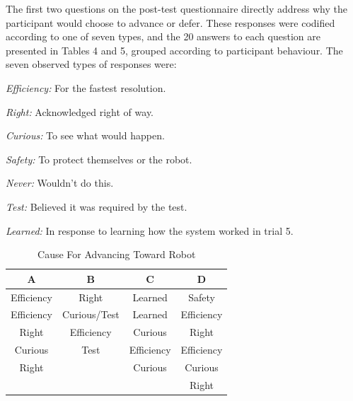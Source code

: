 \documentclass[letterpaper, 10 pt, conference]{ieeeconf}  %
\begin{document}

The first two questions on the post-test questionnaire directly address why the participant would choose to advance or defer. These responses were codified according to one of seven types, and the 20 answers to each question are presented in Tables 4 and 5, grouped according to participant behaviour. The seven observed types of responses were:

\textit{Efficiency:} For the fastest resolution.

\textit{Right:} Acknowledged right of way.

\textit{Curious:} To see what would happen.

\textit{Safety:} To protect themselves or the robot.

\textit{Never:} Wouldn't do this.

\textit{Test:} Believed it was required by the test.

\textit{Learned:} In response to learning how the system worked in trial 5.

\begin{table}[h]
\caption{Cause For Advancing Toward Robot}
\label{Advance}
\begin{center}
\begin{tabular}{|c||c||c||c|}
\hline
\textbf{A} & \textbf{B} & \textbf{C} & \textbf{D}\\
\hline
Efficiency & Right & Learned & Safety\\
\hline
Efficiency & Curious/Test & Learned & Efficiency\\
\hline
Right & Efficiency & Curious & Right\\
\hline
Curious & Test & Efficiency & Efficiency\\
\hline
Right & & Curious & Curious\\
\hline
 & & & Right\\
\hline
\end{tabular}
\end{center}
\end{table}
\end{document}
